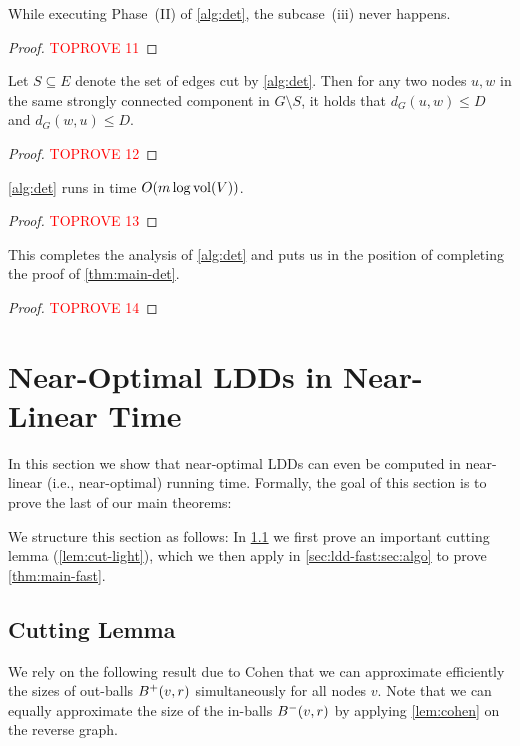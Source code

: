 \documentclass[letterpaper,11pt]{article}
\begin{document}
\begin{lemma} \label{lem:ldd-det-well-defined}
While executing Phase~(II) of \cref{alg:det}, the subcase~(iii) never happens.
\end{lemma}
\begin{proof}\textcolor{red}{TOPROVE 11}\end{proof}

\begin{lemma} \label{lem:ldd-det-correctness}
Let $S \subseteq E$ denote the set of edges cut by \cref{alg:det}. Then for any two nodes $u, w$ in the same strongly connected component in $G \setminus S$, it holds that $d_G(u, w) \leq D$ and $d_G(w, u) \leq D$.
\end{lemma}
\begin{proof}\textcolor{red}{TOPROVE 12}\end{proof}

\begin{lemma} \label{lem:ldd-det-time}
\cref{alg:det} runs in time $O(m \log \operatorname{vol}(V))$.
\end{lemma}
\begin{proof}\textcolor{red}{TOPROVE 13}\end{proof}

This completes the analysis of \cref{alg:det} and puts us in the position of completing the proof of \cref{thm:main-det}.

\begin{proof}\textcolor{red}{TOPROVE 14}\end{proof} \section{Near-Optimal LDDs in Near-Linear Time} \label{sec:ldd-fast}
In this section we show that near-optimal LDDs can even be computed in near-linear (i.e., near-optimal) running time. Formally, the goal of this section is to prove the last of our main theorems:

\thmMainFast*

We structure this section as follows: In \cref{sec:ldd-fast:sec:cutting} we first prove an important cutting lemma (\cref{lem:cut-light}), which we then apply in \cref{sec:ldd-fast:sec:algo} to prove \cref{thm:main-fast}.

\subsection{Cutting Lemma} \label{sec:ldd-fast:sec:cutting}
We rely on the following result due to Cohen that we can approximate efficiently the sizes of out-balls $B^+(v, r)$ simultaneously for all nodes $v$. Note that we can equally approximate the size of the in-balls $B^-(v, r)$ by applying \cref{lem:cohen} on the reverse graph.
\end{document}
